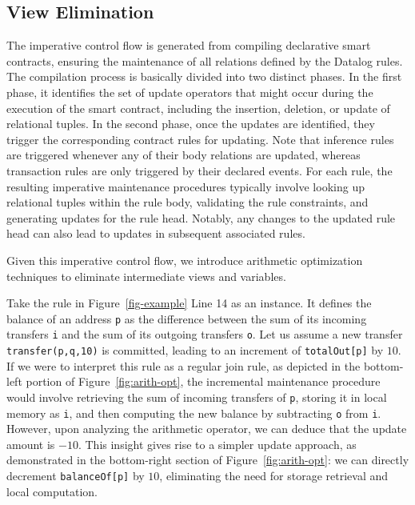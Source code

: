 \subsection{View Elimination}
\label{ssec:arith_view}

The imperative control flow is generated from compiling declarative smart contracts, ensuring the maintenance of all relations defined by the Datalog rules. The compilation process is basically divided into two distinct phases. In the first phase, it identifies the set of update operators that might occur during the execution of the smart contract, including the insertion, deletion, or update of relational tuples. In the second phase, once the updates are identified, they trigger the corresponding contract rules for updating. Note that inference rules are triggered whenever any of their body relations are updated, whereas transaction rules are only triggered by their declared events. For each rule, the resulting imperative maintenance procedures typically involve looking up relational tuples within the rule body, validating the rule constraints, and generating updates for the rule head. Notably, any changes to the updated rule head can also lead to updates in subsequent associated rules.

Given this imperative control flow, we introduce arithmetic optimization techniques to eliminate intermediate views and variables.


Take the rule in Figure~\ref{fig-example} Line 14 as an instance. It defines the balance of an address {\sf \lstinline{p}} as the difference between the sum of its incoming transfers {\sf \lstinline{i}} and the sum of its outgoing transfers {\sf \lstinline{o}}. Let us assume a new transfer {\sf \lstinline{transfer(p,q,10)}} is committed, leading to an increment of {\sf \lstinline{totalOut[p]}} by $10$. If we were to interpret this rule as a regular join rule, as depicted in the bottom-left portion of Figure~\ref{fig:arith-opt}, the incremental maintenance procedure would involve retrieving the sum of incoming transfers of {\sf \lstinline{p}}, storing it in local memory as {\sf \lstinline{i}}, and then computing the new balance by subtracting {\sf \lstinline{o}} from {\sf \lstinline{i}}. However, upon analyzing the arithmetic operator, we can deduce that the update amount is $-10$. This insight gives rise to a simpler update approach, as demonstrated in the bottom-right section of Figure~\ref{fig:arith-opt}: we can directly decrement {\sf \lstinline{balanceOf[p]}} by $10$, eliminating the need for storage retrieval and local computation.

